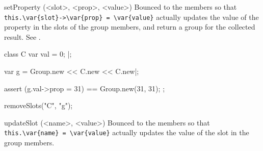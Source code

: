 \begin{urbiscriptapi}
\item[setProperty](<slot>, <prop>, <value>)%
  Bounced to the members so that
  \lstinline|this.\var{slot}->\var{prop} = \var{value}| actually updates the
  value of the property  in the slots  of the group
  members, and return a group for the collected result.  See
  .

\begin{urbiscript}
class C
{
  var val = 0;
}|;

var g = Group.new << C.new << C.new|;

assert
{
  (g.val->prop = 31) == Group.new(31, 31);
};
\end{urbiscript}
\begin{urbicomment}
  removeSlots("C", "g");
\end{urbicomment}


\item[updateSlot](<name>, <value>)%
  Bounced to the members so that
  \lstinline|this.\var{name} = \var{value}|
  actually updates the value of the slot  in
  the group members.
\end{urbiscriptapi}

